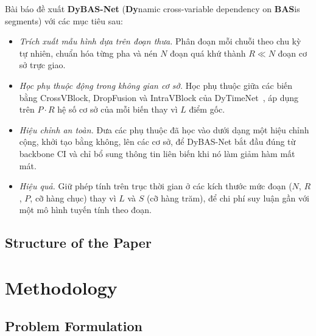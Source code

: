 \documentclass[conference]{IEEEtran}
\begin{document}
Bài báo đề xuất \textbf{DyBAS-Net} (\textbf{Dy}namic cross-variable dependency on \textbf{BAS}is segments) với các mục
tiêu sau:
\begin{itemize}
  \item \emph{Trích xuất mẫu hình dựa trên đoạn thưa.} Phân đoạn mỗi chuỗi theo chu kỳ tự nhiên, chuẩn hóa từng pha và
        nén $N$ đoạn quá khứ thành $R\ll N$ đoạn cơ sở trực giao.
  \item \emph{Học phụ thuộc động trong không gian cơ sở.} Học phụ thuộc giữa các biến bằng CrossVBlock, DropFusion và
        IntraVBlock của DyTimeNet~\cite{Chen2026DyTimeNet}, áp dụng trên $P\cdot R$ hệ số cơ sở của mỗi biến thay vì
        $L$ điểm gốc.
  \item \emph{Hiệu chỉnh an toàn.} Đưa các phụ thuộc đã học vào dưới dạng một hiệu chỉnh cộng, khởi tạo bằng không, lên
        các cơ sở, để DyBAS-Net bắt đầu đúng từ backbone CI và chỉ bổ sung thông tin liên biến khi nó làm giảm hàm
        mất mát.
  \item \emph{Hiệu quả.} Giữ phép tính trên trục thời gian ở các kích thước mức đoạn ($N$, $R$, $P$, cỡ hàng chục) thay
        vì $L$ và $S$ (cỡ hàng trăm), để chi phí suy luận gần với một mô hình tuyến tính theo đoạn.
\end{itemize}

\subsection{Structure of the Paper}



\section{Methodology}
\label{sec:method}

\subsection{Problem Formulation}
\label{sec:formulation}
\end{document}
